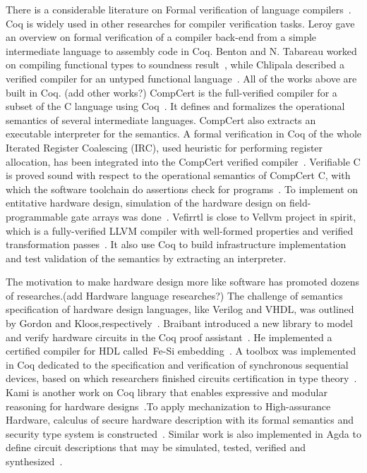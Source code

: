 
There is a considerable literature on Formal verification of language compilers~\cite{LeAS14,ZhangSS17}. Coq is widely used in other researches for compiler verification tasks. Leroy gave an overview on formal verification of a compiler back-end from a simple intermediate language to assembly code in Coq. Benton and N. Tabareau worked on compiling functional types to soundness result~\cite{benton2009}, while Chlipala described a verified compiler for an untyped functional language~\cite{Chlipala10,Chlipala07}. All of the works above are built in Coq. (add other works?) CompCert is the full-verified compiler for a subset of the C language using Coq~\cite{Leroy09}. It defines and formalizes the operational semantics of several intermediate languages. CompCert also extracts an executable interpreter for the semantics. A formal verification in Coq of the whole Iterated Register Coalescing (IRC), used heuristic for performing register allocation, has been integrated into the CompCert verified compiler~\cite{Blazy10}. Verifiable C is proved sound with respect to the operational semantics of CompCert C, with which the software toolchain do assertions check for programs~\cite{Appel11}. To implement on entitative hardware design, simulation of the hardware design on field-programmable gate arrays was done~\cite{Nikhil2011}.
Vefirrtl is close to Vellvm project in spirit, which is a fully-verified LLVM compiler with well-formed properties and verified transformation passes~\cite{ZhaoNMZ12}. It also use Coq to build infrastructure implementation and test validation of the semantics by extracting an interpreter.

The motivation to make hardware design more like software has promoted dozens of researches.(add Hardware language researches?) The challenge of semantics specification of hardware design languages, like Verilog and VHDL, was outlined by Gordon and Kloos,respectively~\cite{Gordon95,Kloos1995FormalSF}. Braibant introduced a new library to model and verify hardware circuits in the Coq proof assistant~\cite{Braibant11}. He implemented a certified compiler for HDL called Fe-Si embedding~\cite{Braibant13}. A toolbox was implemented in Coq dedicated to the specification and verification of synchronous sequential devices, based on which researchers finished circuits certification in type theory~\cite{Coupet04}. Kami is another work on Coq library that enables expressive and modular reasoning for hardware designs~\cite{ChoiACM17}.To apply mechanization to High-assurance Hardware, calculus of secure hardware description with its formal semantics and security type system is constructed~\cite{Reynolds19}. Similar work is also implemented in Agda to define circuit descriptions that may be simulated, tested, verified and synthesized~\cite{FlorSS15}.

